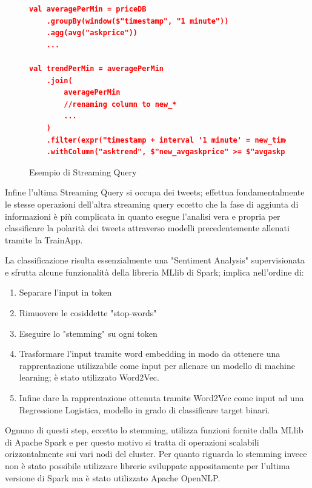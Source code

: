 \begin{figure}
    \begin{lstlisting}[language=json,firstnumber=1]
val averagePerMin = priceDB
    .groupBy(window($"timestamp", "1 minute"))
    .agg(avg("askprice"))
    ...

val trendPerMin = averagePerMin
    .join(
        averagePerMin
        //renaming column to new_*
        ...
    )
    .filter(expr("timestamp + interval '1 minute' = new_timestamp"))
    .withColumn("asktrend", $"new_avgaskprice" >= $"avgaskprice")
    \end{lstlisting}
    \caption{Esempio di Streaming Query}
    \label{trendpermin}
\end{figure}

Infine l'ultima Streaming Query si occupa dei tweets; effettua fondamentalmente le stesse operazioni
dell'altra streaming query eccetto che la fase di aggiunta di informazioni è più complicata in quanto
esegue l'analisi vera e propria per classificare la polarità dei tweets attraverso modelli
precedentemente allenati tramite la TrainApp.

La classificazione risulta essenzialmente una "Sentiment Analysis" supervisionata e sfrutta alcune
funzionalità della libreria MLlib di Spark; implica nell'ordine di:

\begin{enumerate}
    \item Separare l'input in token
    \item Rimuovere le cosiddette "stop-words"
    \item Eseguire lo "stemming" su ogni token
    \item Trasformare l'input tramite word embedding in modo da ottenere una rapprentazione
    utilizzabile come input per allenare un modello di machine learning; è stato utilizzato
    Word2Vec.
    \item Infine dare la rapprentazione ottenuta tramite Word2Vec come input ad una Regressione
    Logistica, modello in grado di classificare target binari.
\end{enumerate}

Ognuno di questi step, eccetto lo stemming, utilizza funzioni fornite dalla MLlib di Apache Spark
e per questo motivo si tratta di operazioni scalabili orizzontalmente sui vari nodi del cluster.
Per quanto riguarda lo stemming invece non è stato possibile utilizzare librerie sviluppate
appositamente per l'ultima versione di Spark ma è stato utilizzato Apache OpenNLP.

